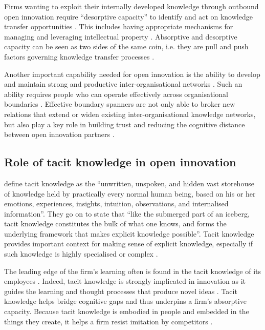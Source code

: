 Firms wanting to exploit their internally developed knowledge through outbound open innovation require \enquote{desorptive capacity} to identify and act on knowledge transfer opportunities \citep{lichtenthaler2010technology}. This includes having appropriate mechanisms for managing and leveraging intellectual property \citep{chesbrough2012open,denford2018absorption}. Absorptive and desorptive capacity can be seen as two sides of the same coin, i.e. they are pull and push factors governing knowledge transfer processes \citep{dell2015absorptive}. \medskip

Another important capability needed for open innovation is the ability to develop and maintain strong and productive inter-organisational networks \citep{chesbrough2012open}. Such an ability requires people who can operate effectively across organisational boundaries \citep{tushman1981boundary,levin2004strength,meyer2010rise}. Effective boundary spanners are not only able to broker new relations that extend or widen existing inter-organisational knowledge networks, but also play a key role in building trust and reducing the cognitive distance between open innovation partners \citep{fleming2007brokerage,goffin2010managing,renzl2008trust,sankowska2013relationships,kucharska2016trust}. 

\subsection{Role of tacit knowledge in open innovation}

\citet{kreutz2014catalyzing} define tacit knowledge as the \enquote{unwritten, unspoken, and hidden vast storehouse of knowledge held by practically every normal human being, based on his or her emotions, experiences, insights, intuition, observations, and internalised information}. They go on to state that \enquote{like the submerged part of an iceberg, tacit knowledge constitutes the bulk of what one knows, and forms the underlying framework that makes explicit knowledge possible}. Tacit knowledge provides important context for making sense of explicit knowledge, especially if such knowledge is highly specialised or complex \citep{von1994sticky,szulanski1996exploring,leonard1998role,seidler2008use}. \medskip

The leading edge of the firm’s learning often is found in the tacit knowledge of its employees \citep{horvath2000working}. Indeed, tacit knowledge is strongly implicated in innovation as it guides the learning and thought processes that produce novel ideas \citep{leonard1998role,amar2008descriptive,leonard2014knowledge}. Tacit knowledge helps bridge cognitive gaps and thus underpins a firm's absorptive capacity. Because tacit knowledge is embodied in people and embedded in the things they create, it helps a firm resist imitation by competitors \citep{horvath2000working}. \medskip

